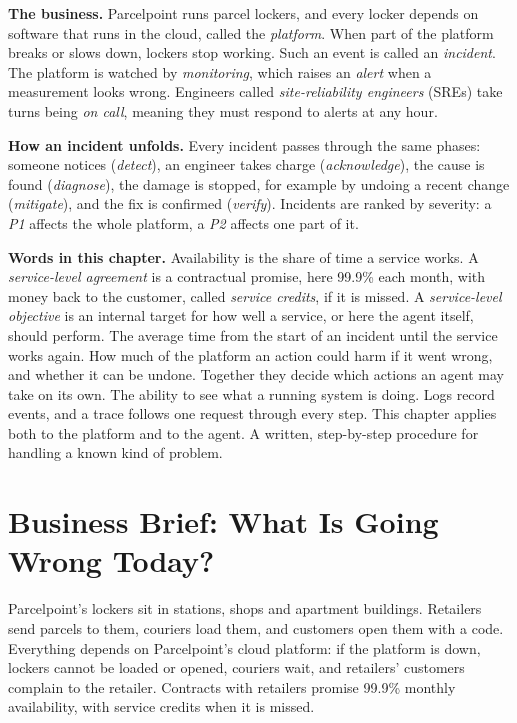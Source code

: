 \begin{beforeyoustart}
\textbf{The business.} Parcelpoint runs parcel lockers, and every locker depends on software that runs in the cloud, called the \emph{platform}. When part of the platform breaks or slows down, lockers stop working. Such an event is called an \emph{incident}. The platform is watched by \emph{monitoring}, which raises an \emph{alert} when a measurement looks wrong. Engineers called \emph{site-reliability engineers} (SREs) take turns being \emph{on call}, meaning they must respond to alerts at any hour.

\textbf{How an incident unfolds.} Every incident passes through the same phases: someone notices (\emph{detect}), an engineer takes charge (\emph{acknowledge}), the cause is found (\emph{diagnose}), the damage is stopped, for example by undoing a recent change (\emph{mitigate}), and the fix is confirmed (\emph{verify}). Incidents are ranked by severity: a \emph{P1} affects the whole platform, a \emph{P2} affects one part of it.

\textbf{Words in this chapter.}
 Availability is the share of time a service works. A \emph{service-level agreement} is a contractual promise, here 99.9\% each month, with money back to the customer, called \emph{service credits}, if it is missed.
 A \emph{service-level objective} is an internal target for how well a service, or here the agent itself, should perform.
 The average time from the start of an incident until the service works again.
 How much of the platform an action could harm if it went wrong, and whether it can be undone. Together they decide which actions an agent may take on its own.
 The ability to see what a running system is doing. Logs record events, and a trace follows one request through every step. This chapter applies both to the platform and to the agent.
 A written, step-by-step procedure for handling a known kind of problem.
\end{beforeyoustart}


\section{Business Brief: What Is Going Wrong Today?}
\label{sec:inc-brief}

Parcelpoint's lockers sit in stations, shops and apartment buildings. Retailers send parcels to them, couriers load them, and customers open them with a code. Everything depends on Parcelpoint's cloud platform: if the platform is down, lockers cannot be loaded or opened, couriers wait, and retailers' customers complain to the retailer. Contracts with retailers promise 99.9\% monthly availability, with service credits when it is missed.

